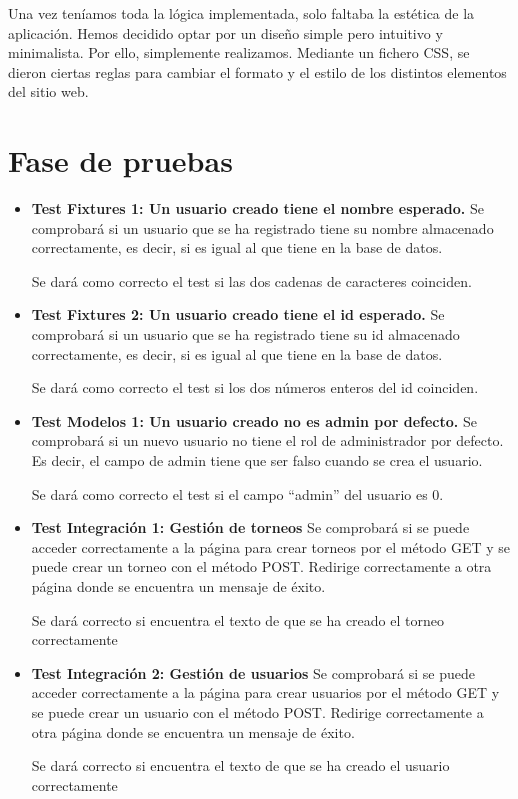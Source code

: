 \documentclass{article}
\begin{document}
Una vez teníamos toda la lógica implementada, solo faltaba la estética de la aplicación. Hemos decidido optar por un diseño simple pero intuitivo y minimalista. Por ello,
simplemente realizamos. Mediante un fichero CSS, se dieron ciertas reglas para cambiar el formato y el estilo de los distintos elementos del sitio web.

\section{Fase de pruebas}
\begin{itemize}
  \item \textbf{Test Fixtures 1: Un usuario creado tiene el nombre esperado.}
  Se comprobará si un usuario que se ha registrado tiene su nombre almacenado correctamente, es decir,
  si es igual al que tiene en la base de datos.

  Se dará como correcto el test si las dos cadenas de caracteres coinciden.

  \item \textbf{Test Fixtures 2: Un usuario creado tiene el id esperado.}
  Se comprobará si un usuario que se ha registrado tiene su id almacenado correctamente, es decir,
  si es igual al que tiene en la base de datos. 

  Se dará como correcto el test si los dos números enteros del id coinciden.

  \item \textbf{Test Modelos 1: Un usuario creado no es admin por defecto.}
  Se comprobará si un nuevo usuario no tiene el rol de administrador por defecto. Es decir,
  el campo de admin tiene que ser falso cuando se crea el usuario.

  Se dará como correcto el test si el campo ``admin'' del usuario es 0.

  \item \textbf{Test Integración 1: Gestión de torneos} Se comprobará si se puede acceder correctamente a la página para crear torneos por el método GET y
   se puede crear un torneo con el método POST. Redirige correctamente a otra página donde se encuentra un mensaje de éxito.

   Se dará correcto si encuentra el texto de que se ha creado el torneo correctamente
   \item \textbf{Test Integración 2: Gestión de usuarios} Se comprobará si se puede acceder correctamente a la página para crear usuarios por el método GET y
   se puede crear un usuario con el método POST. Redirige correctamente a otra página donde se encuentra un mensaje de éxito.

   Se dará correcto si encuentra el texto de que se ha creado el usuario correctamente

\end{itemize}
\end{document}

